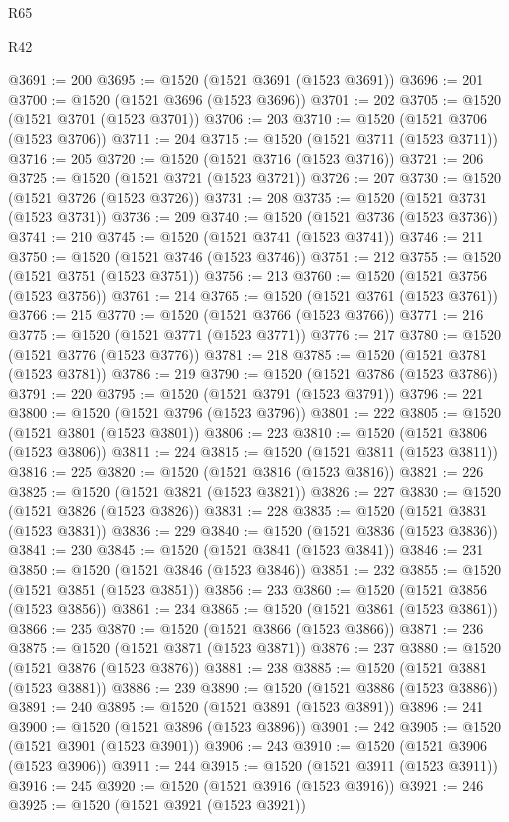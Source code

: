 \begin{lexlean}{R65}
\begin{lexlean}{R42}
\begin{coremodule}
{{{{{{{{{{{{{{{{{{{{{{{{{{{{{{{{{{{{{{{{{{{{{{{{{{{{{{{{{{{{{{{{{{{{{{{{{{{{{{{{{{{{{{{{{{{{{{{{{{{{{{{{{{{{{{{{{{{{{{{{{{{{{{{{{{{{{{{{{{{{{{{{{{{{{{{{{{{{{{{{{{{{{{{{{{{{{{{{{{{{{{{{@3691 := 200
@3695 := @1520 (@1521 @3691 (@1523 @3691))
@3696 := 201
@3700 := @1520 (@1521 @3696 (@1523 @3696))
@3701 := 202
@3705 := @1520 (@1521 @3701 (@1523 @3701))
@3706 := 203
@3710 := @1520 (@1521 @3706 (@1523 @3706))
@3711 := 204
@3715 := @1520 (@1521 @3711 (@1523 @3711))
@3716 := 205
@3720 := @1520 (@1521 @3716 (@1523 @3716))
@3721 := 206
@3725 := @1520 (@1521 @3721 (@1523 @3721))
@3726 := 207
@3730 := @1520 (@1521 @3726 (@1523 @3726))
@3731 := 208
@3735 := @1520 (@1521 @3731 (@1523 @3731))
@3736 := 209
@3740 := @1520 (@1521 @3736 (@1523 @3736))
@3741 := 210
@3745 := @1520 (@1521 @3741 (@1523 @3741))
@3746 := 211
@3750 := @1520 (@1521 @3746 (@1523 @3746))
@3751 := 212
@3755 := @1520 (@1521 @3751 (@1523 @3751))
@3756 := 213
@3760 := @1520 (@1521 @3756 (@1523 @3756))
@3761 := 214
@3765 := @1520 (@1521 @3761 (@1523 @3761))
@3766 := 215
@3770 := @1520 (@1521 @3766 (@1523 @3766))
@3771 := 216
@3775 := @1520 (@1521 @3771 (@1523 @3771))
@3776 := 217
@3780 := @1520 (@1521 @3776 (@1523 @3776))
@3781 := 218
@3785 := @1520 (@1521 @3781 (@1523 @3781))
@3786 := 219
@3790 := @1520 (@1521 @3786 (@1523 @3786))
@3791 := 220
@3795 := @1520 (@1521 @3791 (@1523 @3791))
@3796 := 221
@3800 := @1520 (@1521 @3796 (@1523 @3796))
@3801 := 222
@3805 := @1520 (@1521 @3801 (@1523 @3801))
@3806 := 223
@3810 := @1520 (@1521 @3806 (@1523 @3806))
@3811 := 224
@3815 := @1520 (@1521 @3811 (@1523 @3811))
@3816 := 225
@3820 := @1520 (@1521 @3816 (@1523 @3816))
@3821 := 226
@3825 := @1520 (@1521 @3821 (@1523 @3821))
@3826 := 227
@3830 := @1520 (@1521 @3826 (@1523 @3826))
@3831 := 228
@3835 := @1520 (@1521 @3831 (@1523 @3831))
@3836 := 229
@3840 := @1520 (@1521 @3836 (@1523 @3836))
@3841 := 230
@3845 := @1520 (@1521 @3841 (@1523 @3841))
@3846 := 231
@3850 := @1520 (@1521 @3846 (@1523 @3846))
@3851 := 232
@3855 := @1520 (@1521 @3851 (@1523 @3851))
@3856 := 233
@3860 := @1520 (@1521 @3856 (@1523 @3856))
@3861 := 234
@3865 := @1520 (@1521 @3861 (@1523 @3861))
@3866 := 235
@3870 := @1520 (@1521 @3866 (@1523 @3866))
@3871 := 236
@3875 := @1520 (@1521 @3871 (@1523 @3871))
@3876 := 237
@3880 := @1520 (@1521 @3876 (@1523 @3876))
@3881 := 238
@3885 := @1520 (@1521 @3881 (@1523 @3881))
@3886 := 239
@3890 := @1520 (@1521 @3886 (@1523 @3886))
@3891 := 240
@3895 := @1520 (@1521 @3891 (@1523 @3891))
@3896 := 241
@3900 := @1520 (@1521 @3896 (@1523 @3896))
@3901 := 242
@3905 := @1520 (@1521 @3901 (@1523 @3901))
@3906 := 243
@3910 := @1520 (@1521 @3906 (@1523 @3906))
@3911 := 244
@3915 := @1520 (@1521 @3911 (@1523 @3911))
@3916 := 245
@3920 := @1520 (@1521 @3916 (@1523 @3916))
@3921 := 246
@3925 := @1520 (@1521 @3921 (@1523 @3921))
}}}}}}}}}}}}}}}}}}}}}}}}}}}}}}}}}}}}}}}}}}}}}}}}}}}}}}}}}}}}}}}}}}}}}}}}}}}}}}}}}}}}}}}}}}}}}}}}}}}}}}}}}}}}}}}}}}}}}}}}}}}}}}}}}}}}}}}}}}}}}}}}}}}}}}}}}}}}}}}}}}}}}}}}}}}}}}}}}}}}}}}}
\end{coremodule}
\end{lexlean}
\end{lexlean}
